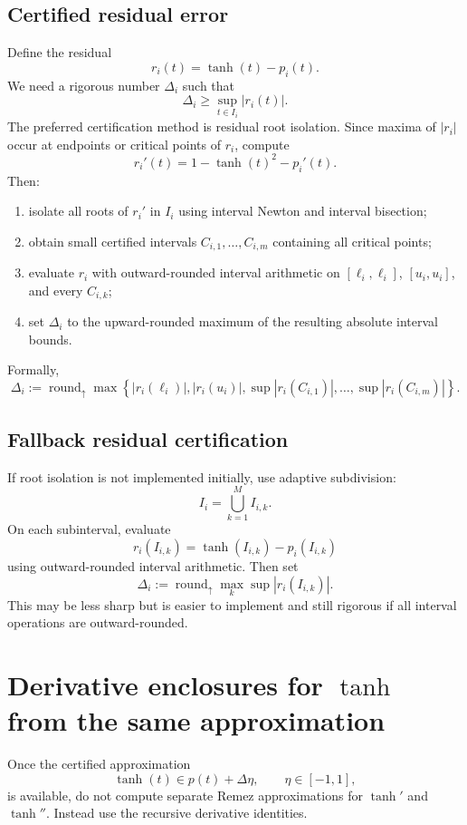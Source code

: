 \documentclass[11pt]{article}
\newcommand{\roundup}{\operatorname{round}_{\uparrow}}
\begin{document}
\subsection{Certified residual error}

Define the residual
\[
    r_i(t)=\tanh(t)-p_i(t).
\]
We need a rigorous number \(\Delta_i\) such that
\[
    \Delta_i
    \geq
    \sup_{t\in I_i}|r_i(t)|.
\]
The preferred certification method is residual root isolation. Since maxima of \(|r_i|\) occur at endpoints or critical points of \(r_i\), compute
\[
    r_i'(t)=1-\tanh(t)^2-p_i'(t).
\]
Then:
\begin{enumerate}[label=(\roman*)]
    \item isolate all roots of \(r_i'\) in \(I_i\) using interval Newton and interval bisection;
    \item obtain small certified intervals \(C_{i,1},\ldots,C_{i,m}\) containing all critical points;
    \item evaluate \(r_i\) with outward-rounded interval arithmetic on \([\ell_i,\ell_i]\), \([u_i,u_i]\), and every \(C_{i,k}\);
    \item set \(\Delta_i\) to the upward-rounded maximum of the resulting absolute interval bounds.
\end{enumerate}
Formally,
\[
    \Delta_i
    :=
    \roundup
    \max\left\{
        |r_i(\ell_i)|,
        |r_i(u_i)|,
        \sup |r_i(C_{i,1})|,
        \ldots,
        \sup |r_i(C_{i,m})|
    \right\}.
\]

\subsection{Fallback residual certification}

If root isolation is not implemented initially, use adaptive subdivision:
\[
    I_i=\bigcup_{k=1}^M I_{i,k}.
\]
On each subinterval, evaluate
\[
    r_i(I_{i,k})
    =
    \tanh(I_{i,k})-p_i(I_{i,k})
\]
using outward-rounded interval arithmetic. Then set
\[
    \Delta_i
    :=
    \roundup
    \max_k \sup |r_i(I_{i,k})|.
\]
This may be less sharp but is easier to implement and still rigorous if all interval operations are outward-rounded.

\section{Derivative enclosures for \texorpdfstring{\(\tanh\)}{tanh} from the same approximation}

Once the certified approximation
\[
    \tanh(t)\in p(t)+\Delta\eta,
    \qquad
    \eta\in[-1,1],
\]
is available, do not compute separate Remez approximations for \(\tanh'\) and \(\tanh''\). Instead use the recursive derivative identities.
\end{document}
